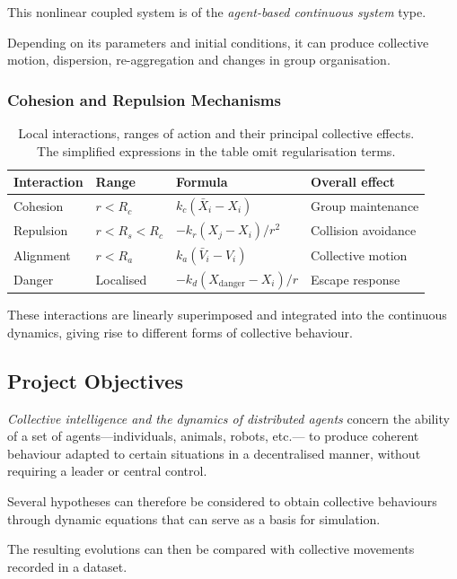 \documentclass[10pt,a4paper]{article}
\begin{document}
This nonlinear coupled system is of the
\emph{agent-based continuous system} type.

Depending on its parameters and initial conditions,
it can produce collective motion, dispersion,
re-aggregation and changes in group organisation.

\subsubsection{Cohesion and Repulsion Mechanisms}

\begin{table}[htbp]
\centering
\small
\begin{tabular}{|l|l|l|l|}
\hline
\textbf{Interaction}
& \textbf{Range}
& \textbf{Formula}
& \textbf{Overall effect}\\
\hline
Cohesion
& $r<R_c$
& $k_c(\bar X_i-X_i)$
& Group maintenance\\
\hline
Repulsion
& $r<R_s<R_c$
& $-k_r(X_j-X_i)/r^2$
& Collision avoidance\\
\hline
Alignment
& $r<R_a$
& $k_a(\bar V_i-V_i)$
& Collective motion\\
\hline
Danger
& Localised
& $-k_d(X_{\mathrm{danger}}-X_i)/r$
& Escape response\\
\hline
\end{tabular}
\caption{
Local interactions, ranges of action and
their principal collective effects.
The simplified expressions in the table omit
regularisation terms.
}
\label{tab:app-forces}
\end{table}

These interactions are linearly superimposed
and integrated into the continuous dynamics,
giving rise to different forms of collective behaviour.

\subsection{Project Objectives}

\emph{Collective intelligence and the dynamics of
distributed agents} concern the ability of a set
of agents---individuals, animals, robots, etc.---
to produce coherent behaviour adapted to certain
situations in a decentralised manner,
without requiring a leader or central control.

Several hypotheses can therefore be considered
to obtain collective behaviours through dynamic
equations that can serve as a basis for simulation.

The resulting evolutions can then be compared
with collective movements recorded in a dataset.
\end{document}
